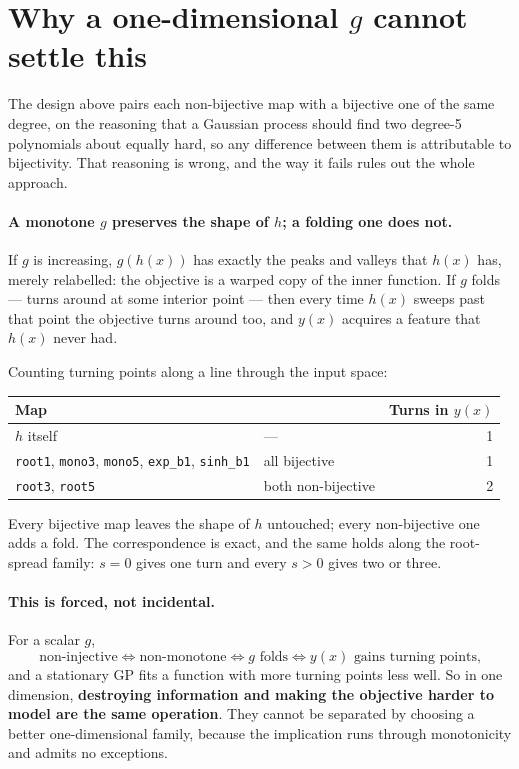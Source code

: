 \section{Why a one-dimensional $g$ cannot settle this}
\label{sec:inseparable}

The design above pairs each non-bijective map with a bijective one of the same
degree, on the reasoning that a Gaussian process should find two degree-5
polynomials about equally hard, so any difference between them is
attributable to bijectivity. That reasoning is wrong, and the way it fails
rules out the whole approach.

\paragraph{A monotone $g$ preserves the shape of $h$; a folding one does not.}
If $g$ is increasing, $g(h(x))$ has exactly the peaks and valleys that $h(x)$
has, merely relabelled: the objective is a warped copy of the inner function.
If $g$ folds --- turns around at some interior point --- then every time
$h(x)$ sweeps past that point the objective turns around too, and $y(x)$
acquires a feature that $h(x)$ never had.

Counting turning points along a line through the input space:

\begin{center}
\begin{tabular}{llr}
\toprule
Map & & Turns in $y(x)$ \\
\midrule
$h$ itself & --- & 1 \\
\midrule
\texttt{root1}, \texttt{mono3}, \texttt{mono5}, \texttt{exp\_b1}, \texttt{sinh\_b1}
 & all bijective & 1 \\
\texttt{root3}, \texttt{root5} & both non-bijective & 2 \\
\bottomrule
\end{tabular}
\end{center}

\noindent Every bijective map leaves the shape of $h$ untouched; every
non-bijective one adds a fold. The correspondence is exact, and the same holds
along the root-spread family: $s=0$ gives one turn and every $s>0$ gives two or
three.

\paragraph{This is forced, not incidental.} For a scalar $g$,
\[
\text{non-injective}
\iff \text{non-monotone}
\iff g \text{ folds}
\iff y(x) \text{ gains turning points,}
\]
and a stationary GP fits a function with more turning points less well. So in
one dimension, \textbf{destroying information and making the objective harder
to model are the same operation}. They cannot be separated by choosing a
better one-dimensional family, because the implication runs through
monotonicity and admits no exceptions.

